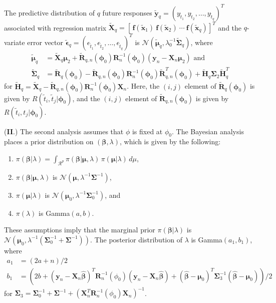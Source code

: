 \documentclass[11pt, oneside]{article}   	%
\begin{document}
The predictive distribution of $q$ future responses $\tilde{\mathbf{y}}_q = (y_{\tilde{t}_1}, y_{\tilde{t}_2},\ldots, y_{\tilde{t}_q})^T$ associated with regression matrix $\tilde{\mathbf{X}}_q = [\, \mathbf{f}(\tilde{\mathbf{x}}_1) ~ \mathbf{f}(\tilde{\mathbf{x}}_2) ~ \cdots ~ \mathbf{f}(\tilde{\mathbf{x}}_q)]^T$ and the $q$-variate error vector $\tilde{\mathbf{\epsilon}}_q=(\epsilon_{\tilde{t}_1}, \epsilon_{\tilde{t}_2}, \ldots, \epsilon_{\tilde{t}_q})^T$ is $\mathcal{N} \left( \tilde{\mathbf{\mu}}_q, \lambda_0^{-1} \tilde{\mathbf{\Sigma}}_q \right)$, where
\begin{align*}
\tilde{\mathbf{\mu}}_q &= \tilde{\mathbf{X}}_q \mathbf{\mu}_2 + \tilde{\mathbf{R}}_{q,n}(\mathbf{\phi}_0) \mathbf{R}_n^{-1}(\mathbf{\phi}_0) \left( \mathbf{y}_n - \mathbf{X}_n \mathbf{\mu}_2 \right) \mbox{ and} \\[1ex]
\tilde{\mathbf{\Sigma}}_q &= \tilde{\mathbf{R}}_q(\mathbf{\phi}_0)-\tilde{\mathbf{R}}_{q,n}(\mathbf{\phi}_0) \mathbf{R}_n^{-1}(\mathbf{\phi}_0) \tilde{\mathbf{R}}_{q,n}^T(\mathbf{\phi}_0)+\tilde{\mathbf{H}}_q \mathbf{\Sigma}_2 \tilde{\mathbf{H}}_q^T
\end{align*}
for $\tilde{\mathbf{H}}_q = \tilde{\mathbf{X}}_q - \tilde{\mathbf{R}}_{q,n}(\mathbf{\phi}_0) \mathbf{R}_n^{-1}(\mathbf{\phi}_0) \mathbf{X}_n$.  Here, the $(i,j)$ element of $\tilde{\mathbf{R}}_q(\mathbf{\phi}_0)$ is given by $R(\tilde{t}_i, \tilde{t}_j | \mathbf{\phi}_0)$, and the $(i,j)$ element of $\tilde{\mathbf{R}}_{q,n}(\mathbf{\phi}_0)$ is given by $R(\tilde{t}_i, t_j | \mathbf{\phi}_0)$.

({\bf II}.)  The second analysis assumes that $\phi$ is fixed at $\phi_0$.  The Bayesian analysis places a prior distribution on $(\mathbf{\beta}, \lambda)$, which is given by the following:
\begin{enumerate}
\item $\pi(\mathbf{\beta} | \lambda) = \int_{\mathcal{R}^p} \pi(\mathbf{\beta} | \mathbf{\mu}, \lambda) \, \pi(\mathbf{\mu} | \lambda) \, d\mu$,
\item $\pi(\mathbf{\beta} | \mathbf{\mu}, \lambda)$ is $\mathcal{N}( \mathbf{\mu}, \lambda^{-1} \mathbf{\Sigma}^{-1} )$,
\item $\pi(\mathbf{\mu} | \lambda)$ is $\mathcal{N}( \mathbf{\mu}_0, \lambda^{-1} \mathbf{\Sigma}_0^{-1} )$, and
\item $\pi(\lambda)$ is Gamma$(a, b)$.
\end{enumerate}
These assumptions imply that the marginal prior $\pi(\mathbf{\beta} | \lambda)$ is $\mathcal{N} \left( \mathbf{\mu}_0, \lambda^{-1} \left( \mathbf{\Sigma}_0^{-1}+\mathbf{\Sigma}^{-1} \right) \right)$.  The posterior distribution of $\lambda$ is Gamma$(a_1, b_1)$, where
\begin{align*}
a_1 & = (2a+n)/2 \\
b_1 &= \left(2b+(\mathbf{y}_n-\mathbf{X}_n \hat{\mathbf{\beta}})^T \mathbf{R}_n^{-1} (\phi_0) (\mathbf{y}_n - \mathbf{X}_n \hat{\mathbf{\beta}})+ (\hat{\mathbf{\beta}}-\mathbf{\mu}_0)^T \mathbf{\Sigma}_3^{-1} (\hat{\mathbf{\beta}}-\mathbf{\mu}_0) \right)/2
\end{align*}
for $\mathbf{\Sigma}_3 = \mathbf{\Sigma}_0^{-1}+\mathbf{\Sigma}^{-1}+\left(\mathbf{X}_n^T \mathbf{R}_n^{-1} (\phi_0) \mathbf{X}_n \right)^{-1}$.
\end{document}
